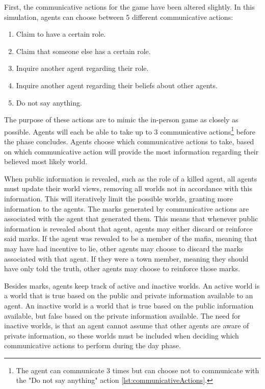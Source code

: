 First, the communicative actions for the game have been altered slightly. In
this simulation, agents can choose between 5 different communicative actions:
\begin{enumerate}
	\itemsep0px
	\item \label{Com}Claim to have a certain role.
	\item Claim that someone else has a certain role.
	\item Inquire another agent regarding their role.
	\item Inquire another agent regarding their beliefs about other agents.
	\item Do not say anything. \label{lst:communicativeActions}
\end{enumerate}
The purpose of these actions are to mimic the in-person game as closely as
possible. Agents will each be able to take up to 3 communicative actions\footnote{The agent can communicate 3 times but can choose not to communicate with the "Do not say anything" action \ref{lst:communicativeActions}.} before the
phase concludes. Agents choose which communicative actions to take, based on which communicative action
will provide the most information regarding their believed most likely world.

When public information is revealed, such as the role of a killed agent, all
agents must update their world views, removing all worlds not in accordance
with this information. This will iteratively limit the possible worlds,
granting more information to the agents. The marks generated by communicative
actions are associated with the agent that generated them. This means that
whenever public information is revealed about that agent, agents may either
discard or reinforce said marks. If the agent was revealed to be a member of
the mafia, meaning that may have had incentive to lie, other agents may choose
to discard the marks associated with that agent. If they were a town member,
meaning they should have only told the truth, other agents may choose to
reinforce those marks.

Besides marks, agents keep track of active and inactive worlds. An active world
is a world that is true based on the public and private information available
to an agent. An inactive world is a world that is true based on the public
information available, but false based on the private information available.
The need for inactive worlds, is that an agent cannot assume that other agents
are aware of private information, so these worlds must be included when
deciding which communicative actions to perform during the day phase.

